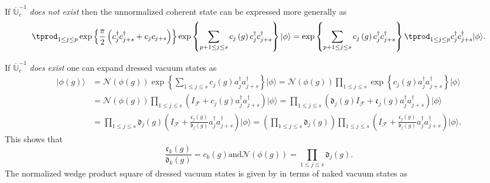 \documentclass[aps, preprint]{revtex4}
\begin{document}
If $\overline{\mathbb{U}}_{c}^{ -1}$ \emph{does not exist} then the unnormalized coherent state can be expressed more generally as
\begin{equation} \tprod _{1 \leq j \leq p}\exp  \left \{\frac{\pi }{2} \left (c_{j}^{ \dag } c_{j +s}^{ \dag } +c_{j} c_{j +s}\right )\right \} \exp  \left \{\sum _{p +1 \leq j \leq s}c_{j} \left (g\right ) c_{j}^{ \dag } c_{j +s}^{ \dag }\right \}\vert \phi  \rangle  =\exp  \left \{\sum _{p +1 \leq j \leq s}c_{j} \left (g\right ) c_{j}^{ \dag } c_{j +s}^{ \dag }\right \}  \tprod _{1 \leq j \leq p}c_{j}^{ \dag } c_{j +s}^{ \dag }\vert \phi  \rangle \text{.}
\end{equation}

If $\overline{\mathbb{U}}_{c}^{ -1}$ \emph{does exist} one can expand dressed vacuum states as
\begin{align}\vert \phi  \left (g\right ) \rangle  &  =\mathcal{N} \left (\phi  \left (g\right )\right ) \exp  \left \{\sum _{1 \leq j \leq s}c_{j} \left (g\right ) a_{j}^{ \dag } a_{j +s}^{ \dag }\right \}\vert \phi  \rangle  =\mathcal{N} \left (\phi  \left (g\right )\right ) {\displaystyle\prod _{1 \leq j \leq s}}\exp  \left \{c_{j} \left (g\right ) a_{j}^{ \dag } a_{j +s}^{ \dag }\right \}\vert \phi  \rangle  \\
 &  =\mathcal{N} \left (\phi  \left (g\right )\right ) {\displaystyle\prod _{1 \leq j \leq s}}\left (I_{\mathcal{F}} +c_{j} \left (g\right ) a_{j}^{ \dag } a_{j +s}^{ \dag }\right )\vert \phi  \rangle  ={\displaystyle\prod _{1 \leq j \leq s}}\left (\mathfrak{d}_{j} \left (g\right ) I_{\mathcal{F}} +\mathfrak{c}_{j} \left (g\right ) a_{j}^{ \dag } a_{j +s}^{ \dag }\right )\vert \phi  \rangle  \\
 &  ={\displaystyle\prod _{1 \leq j \leq s}}\mathfrak{d}_{j} \left (g\right ) \left (I_{\mathcal{F}} +\frac{\mathfrak{c}_{j} \left (g\right )}{\mathfrak{d}_{j} \left (g\right )} a_{j}^{ \dag } a_{j +s}^{ \dag }\right )\vert \phi  \rangle  =\left ({\displaystyle\prod _{1 \leq j \leq s}}\mathfrak{d}_{j} \left (g\right )\right ) {\displaystyle\prod _{1 \leq j \leq s}}\left (I_{\mathcal{F}} +\frac{\mathfrak{c}_{j} \left (g\right )}{\mathfrak{d}_{j} \left (g\right )} a_{j}^{ \dag } a_{j +s}^{ \dag }\right )\vert \phi  \rangle \text{.}\end{align}This shows that
\begin{equation}\frac{\mathfrak{c}_{k} \left (g\right )}{\mathfrak{d}_{k} \left (g\right )} =c_{k} \left (g\right )\text{and}\mathcal{N} \left (\phi  \left (g\right )\right ) ={\displaystyle\prod _{1 \leq j \leq s}}\mathfrak{d}_{j} \left (g\right )\text{.}
\end{equation}The normalized wedge product square of dressed vacuum states is given by in terms of naked vacuum states as
\end{document}
